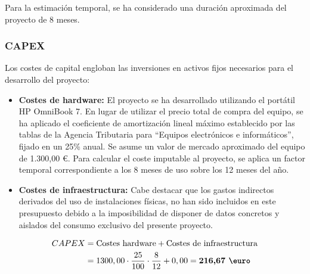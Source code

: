 Para la estimación temporal, se ha considerado una duración aproximada del proyecto de 8 meses.

\subsubsection{CAPEX}
Los costes de capital engloban las inversiones en activos fijos necesarios para el desarrollo del proyecto:
\begin{itemize}
	\item \textbf{Costes de hardware:} El proyecto se ha desarrollado utilizando el portátil HP OmniBook 7. En lugar de utilizar el precio total de compra del equipo, se ha aplicado el coeficiente de amortización lineal máximo establecido por las tablas de la Agencia Tributaria \cite{amortizacion} para ``Equipos electrónicos e informáticos'', fijado en un 25\% anual. Se asume un valor de mercado aproximado del equipo de 1.300,00 \euro. Para calcular el coste imputable al proyecto, se aplica un factor temporal correspondiente a los 8 meses de uso sobre los 12 meses del año.
	\item \textbf{Costes de infraestructura:} Cabe destacar que los gastos indirectos derivados del uso de instalaciones físicas, no han sido incluidos en este presupuesto debido a la imposibilidad de disponer de datos concretos y aislados del consumo exclusivo del presente proyecto.
\end{itemize}

\begin{equation}
	\begin{split}
		CAPEX &= \text{Costes hardware} + \text{Costes de infraestructura} \\
		&= 1300,00 \cdot \frac{25}{100} \cdot \frac{8}{12} + 0,00 = \textbf{216,67 \euro}
	\end{split}
\end{equation}


